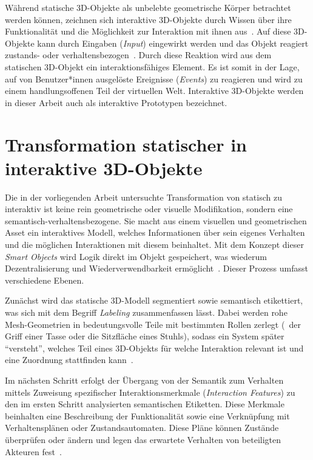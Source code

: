 Während statische 3D-Objekte als unbelebte geometrische Körper betrachtet werden können, zeichnen sich interaktive 3D-Objekte durch Wissen über ihre Funktionalität und die Möglichkeit zur Interaktion mit ihnen aus~\cite{kallmannModelingBehaviorsInteractive2002}.
Auf diese 3D-Objekte kann durch Eingaben (\textit{Input}) eingewirkt werden und das Objekt reagiert zustands- oder verhaltensbezogen~\cite{steuerDefiningVirtualReality1992}.
Durch diese Reaktion wird aus dem statischen 3D-Objekt ein interaktionsfähiges Element.
Es ist somit in der Lage, auf von Benutzer*innen ausgelöste Ereignisse (\textit{Events}) zu reagieren und wird zu einem handlungsoffenen Teil der virtuellen Welt. Interaktive 3D-Objekte werden in dieser Arbeit auch als interaktive Prototypen bezeichnet.

\section{Transformation statischer in interaktive 3D-Objekte}

Die in der vorliegenden Arbeit untersuchte Transformation von statisch zu interaktiv ist keine rein geometrische oder visuelle Modifikation, sondern eine semantisch-verhaltensbezogene.
Sie macht aus einem visuellen und geometrischen Asset ein interaktives Modell, welches Informationen über sein eigenes Verhalten und die möglichen Interaktionen mit diesem beinhaltet.
Mit dem Konzept dieser \textit{Smart Objects} wird Logik direkt im Objekt gespeichert, was wiederum Dezentralisierung und Wiederverwendbarkeit ermöglicht~\cite{kallmannModelingBehaviorsInteractive2002}. Dieser Prozess umfasst verschiedene Ebenen.

Zunächst wird das statische 3D-Modell segmentiert sowie semantisch etikettiert, was sich mit dem Begriff \textit{Labeling} zusammenfassen lässt.
Dabei werden rohe Mesh-Geometrien in bedeutungsvolle Teile mit bestimmten Rollen zerlegt (\zB~der Griff einer Tasse oder die Sitzfläche eines Stuhls), sodass ein System später \enquote{versteht}, welches Teil eines 3D-Objekts für welche Interaktion relevant ist und eine Zuordnung stattfinden kann~\cite{moPartNetLargescaleBenchmark2018}\cite{hassaninVisualAffordanceFunction2021}.

Im nächsten Schritt erfolgt der Übergang von der Semantik zum Verhalten mittels Zuweisung spezifischer Interaktionsmerkmale (\textit{Interaction Features}) zu den im ersten Schritt analysierten semantischen Etiketten. Diese Merkmale beinhalten eine Beschreibung der Funktionalität sowie eine Verknüpfung mit Verhaltensplänen oder Zustandsautomaten. Diese Pläne können Zustände überprüfen oder ändern und legen das erwartete Verhalten von beteiligten Akteuren fest~\cite{kallmannModelingBehaviorsInteractive2002}.


